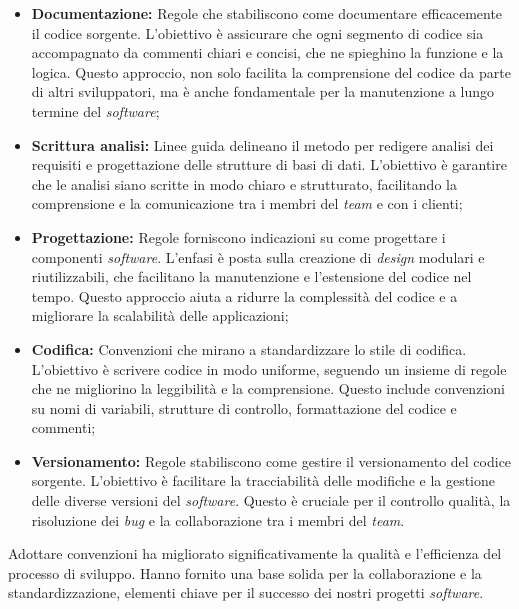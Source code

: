 \begin{itemize}
\item \textbf{Documentazione:} Regole che stabiliscono come documentare efficacemente il codice sorgente. 
L'obiettivo è assicurare che ogni segmento di codice sia accompagnato da commenti chiari e concisi, che ne spieghino la funzione e la logica. 
Questo approccio, non solo facilita la comprensione del codice da parte di altri sviluppatori, ma è anche fondamentale per la manutenzione a lungo termine del \textit{software};

\item \textbf{Scrittura analisi:} Linee guida delineano il metodo per redigere analisi dei requisiti e progettazione delle strutture di basi di dati. 
L'obiettivo è garantire che le analisi siano scritte in modo chiaro e strutturato, facilitando la comprensione e la comunicazione tra i membri del \textit{team} e con i clienti;

\item \textbf{Progettazione:} Regole forniscono indicazioni su come progettare i componenti \textit{software}. 
L'enfasi è posta sulla creazione di \textit{design} modulari e riutilizzabili, che facilitano la manutenzione e l'estensione del codice nel tempo. 
Questo approccio aiuta a ridurre la complessità del codice e a migliorare la scalabilità delle applicazioni;

\item \textbf{Codifica:} Convenzioni che mirano a standardizzare lo stile di codifica. L'obiettivo è scrivere codice in modo uniforme, seguendo un insieme di regole che ne migliorino la leggibilità e la comprensione. Questo include convenzioni su nomi di variabili, strutture di controllo, formattazione del codice e commenti;

\item \textbf{Versionamento:} Regole stabiliscono come gestire il versionamento del codice sorgente. 
L'obiettivo è facilitare la tracciabilità delle modifiche e la gestione delle diverse versioni del \textit{software}. 
Questo è cruciale per il controllo qualità, la risoluzione dei \textit{bug} e la collaborazione tra i membri del \textit{team}.
\end{itemize}

Adottare convenzioni ha migliorato significativamente la qualità e l'efficienza del processo di sviluppo. Hanno fornito una base solida per la collaborazione e la standardizzazione, elementi chiave per il successo dei nostri progetti \textit{software}.
